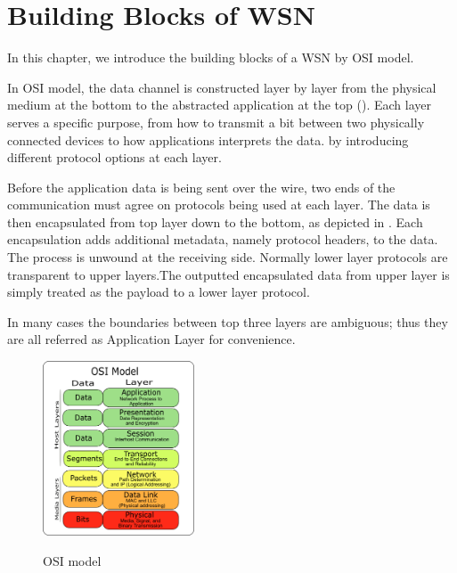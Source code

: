 \chapter{Building Blocks of WSN} \label{Chp: Building Blocks}

In this chapter, we introduce the building blocks of a WSN by OSI model\cite{OSI}.

In OSI model, the data channel is constructed layer by layer from the physical medium at the bottom to the abstracted application at the top (). Each layer serves a specific purpose, from how to transmit a bit between two physically connected devices to how applications interprets the data. by introducing different protocol options at each layer.

Before the application data is being sent over the wire, two ends of the communication must agree on protocols being used at each layer. The data is then encapsulated from top layer down to the bottom, as depicted in . Each encapsulation adds additional metadata, namely protocol headers, to the data. The process is unwound at the receiving side. Normally lower layer protocols are transparent to upper layers.The outputted encapsulated data from upper layer is simply treated as the payload to a lower layer protocol.

In many cases the boundaries between top three layers are ambiguous; thus they are all referred as Application Layer for convenience.
\begin{figure}
	\centering
	{
		\includegraphics[width=0.4\textwidth,]{fig/Osi-model-jb.png}
	}
	\caption{OSI model} \label{fig: OSI model}
\end{figure}


